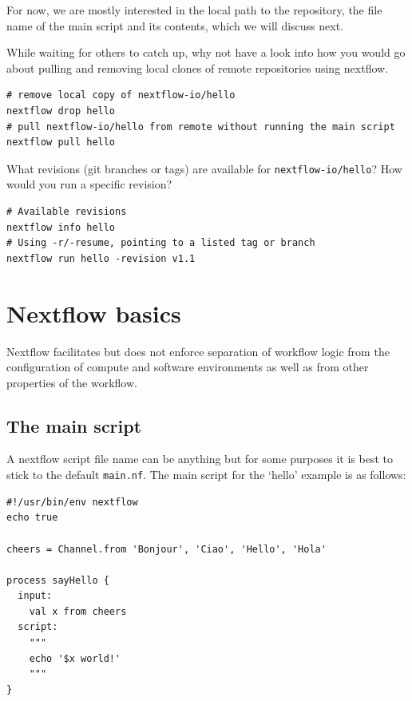 For now, we are mostly interested in the local path to the repository, the file name of the main script 
and its contents, which we will discuss next.



\begin{bonus}
While waiting for others to catch up, why not have a look into how you would go about pulling and removing  
local clones of remote repositories using nextflow.
\begin{answer}
\begin{lstlisting}
# remove local copy of nextflow-io/hello
nextflow drop hello
# pull nextflow-io/hello from remote without running the main script
nextflow pull hello
\end{lstlisting}
\end{answer}
\end{bonus}

\begin{bonus}
What revisions (git branches or tags) are available for \texttt{nextflow-io/hello}?
How would you run a specific revision? 
\begin{answer}
\begin{lstlisting}
# Available revisions 
nextflow info hello
# Using -r/-resume, pointing to a listed tag or branch
nextflow run hello -revision v1.1
\end{lstlisting}
\end{answer}
\end{bonus}

\section{Nextflow basics}

Nextflow facilitates but does not enforce separation of workflow logic from the configuration
of compute and software environments as well as from other properties of the workflow.


\subsection{The main script}

A nextflow script file name can be anything but for some purposes it is best to stick to the default \texttt{main.nf}. The main script for the `hello' example is as follows:


\begin{lstlisting}
#!/usr/bin/env nextflow
echo true 

cheers = Channel.from 'Bonjour', 'Ciao', 'Hello', 'Hola'

process sayHello {
  input: 
    val x from cheers
  script:
    """
    echo '$x world!'
    """
}
\end{lstlisting}


